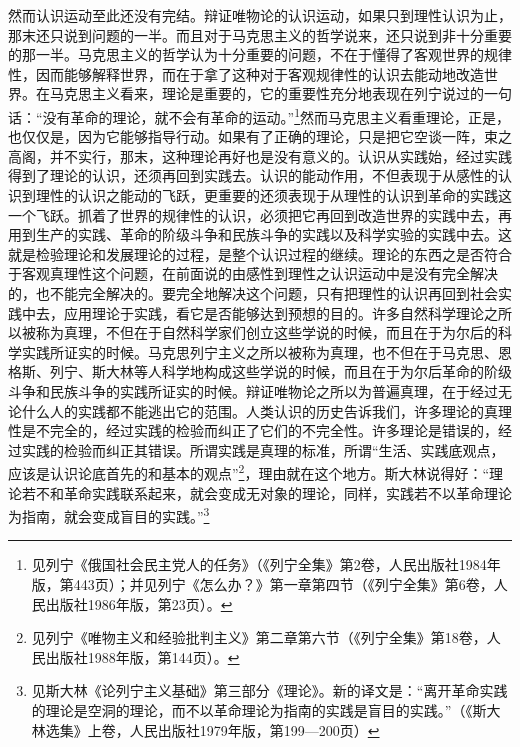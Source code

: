\documentclass[UTF8, 12pt, a4paper]{ctexrep}
\begin{document}
然而认识运动至此还没有完结。辩证唯物论的认识运动，如果只到理性认识为止，那末还只说到问题的一半。而且对于马克思主义的哲学说来，还只说到非十分重要的那一半。马克思主义的哲学认为十分重要的问题，不在于懂得了客观世界的规律性，因而能够解释世界，而在于拿了这种对于客观规律性的认识去能动地改造世界。在马克思主义看来，理论是重要的，它的重要性充分地表现在列宁说过的一句话：“没有革命的理论，就不会有革命的运动。”\footnote{见列宁《俄国社会民主党人的任务》（《列宁全集》第2卷，人民出版社1984年版，第443页）；并见列宁《怎么办？》第一章第四节（《列宁全集》第6卷，人民出版社1986年版，第23页）。}然而马克思主义看重理论，正是，也仅仅是，因为它能够指导行动。如果有了正确的理论，只是把它空谈一阵，束之高阁，并不实行，那末，这种理论再好也是没有意义的。认识从实践始，经过实践得到了理论的认识，还须再回到实践去。认识的能动作用，不但表现于从感性的认识到理性的认识之能动的飞跃，更重要的还须表现于从理性的认识到革命的实践这一个飞跃。抓着了世界的规律性的认识，必须把它再回到改造世界的实践中去，再用到生产的实践、革命的阶级斗争和民族斗争的实践以及科学实验的实践中去。这就是检验理论和发展理论的过程，是整个认识过程的继续。理论的东西之是否符合于客观真理性这个问题，在前面说的由感性到理性之认识运动中是没有完全解决的，也不能完全解决的。要完全地解决这个问题，只有把理性的认识再回到社会实践中去，应用理论于实践，看它是否能够达到预想的目的。许多自然科学理论之所以被称为真理，不但在于自然科学家们创立这些学说的时候，而且在于为尔后的科学实践所证实的时候。马克思列宁主义之所以被称为真理，也不但在于马克思、恩格斯、列宁、斯大林等人科学地构成这些学说的时候，而且在于为尔后革命的阶级斗争和民族斗争的实践所证实的时候。辩证唯物论之所以为普遍真理，在于经过无论什么人的实践都不能逃出它的范围。人类认识的历史告诉我们，许多理论的真理性是不完全的，经过实践的检验而纠正了它们的不完全性。许多理论是错误的，经过实践的检验而纠正其错误。所谓实践是真理的标准，所谓“生活、实践底观点，应该是认识论底首先的和基本的观点”\footnote{见列宁《唯物主义和经验批判主义》第二章第六节（《列宁全集》第18卷，人民出版社1988年版，第144页）。}，理由就在这个地方。斯大林说得好：“理论若不和革命实践联系起来，就会变成无对象的理论，同样，实践若不以革命理论为指南，就会变成盲目的实践。”\footnote{见斯大林《论列宁主义基础》第三部分《理论》。新的译文是：“离开革命实践的理论是空洞的理论，而不以革命理论为指南的实践是盲目的实践。”（《斯大林选集》上卷，人民出版社1979年版，第199—200页）}
\end{document}
